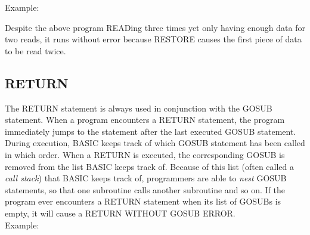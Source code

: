 Example:\\


Despite the above program {\ttfamily READ}ing three times yet only having
enough data for two reads, it runs without error because {\ttfamily RESTORE}
causes the first piece of data to be read twice.\\

\subsection{RETURN}

The {\ttfamily RETURN} statement is always used in conjunction with the
{\ttfamily GOSUB} statement.  When a program encounters a {\ttfamily RETURN}
statement, the program immediately jumps to the statement after the last
executed {\ttfamily GOSUB} statement.  During execution, BASIC keeps track of
which {\ttfamily GOSUB} statement has been called in which order.  When a
{\ttfamily RETURN} is executed, the corresponding {\ttfamily GOSUB} is removed
from the list BASIC keeps track of.  Because of this list (often called a
\emph{call stack}) that BASIC keeps track of, programmers are able to
\emph{nest} {\ttfamily GOSUB} statements, so that one subroutine calls another
subroutine and so on.  If the program ever encounters a {\ttfamily RETURN}
statement when its list of {\ttfamily GOSUB}s is empty, it will cause a
{\ttfamily RETURN WITHOUT GOSUB ERROR}.\\

Example:\\


